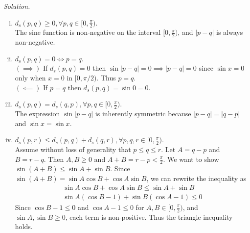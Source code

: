 \documentclass[12pt]{article}
\renewcommand{\_}[1]{\underline{ #1 }}
\theoremstyle{definition}
\newenvironment{exercise}[1]
  {\renewcommand\theinnercustomthm{#1}\innercustomthm}
  {\endinnercustomthm}
\newenvironment{solution}{\par\noindent\textit{Solution.}\ }{\par}
\numberwithin{equation}{subsection}
\begin{document}
\begin{exercise}{6}
    \begin{solution}
        \begin{enumerate} [(i)]
            \item $d_s(p, q) \ge 0, \forall p, q \in [0, \frac{\pi}{2})$. \\
            The sine function is non-negative on the interval $[0, \frac{\pi}{2})$, and $|p - q|$ is always non-negative.
            \item $d_s(p, q) = 0 \iff p = q$. \\
            $(\implies)$ If $d_s(p, q) = 0$ then $\sin |p - q| = 0 \implies |p - q| = 0$ since $\sin x = 0$ only when $x = 0$ in $[0, \pi / 2)$. Thus $p = q$. \\
            $(\impliedby)$ If $p = q$ then $d_s(p, q) = \sin 0 = 0$. 
            \item $d_s(p, q) = d_s(q, p), \forall p, q \in [0, \frac{\pi}{2})$. \\
            The expression $\sin |p - q|$ is inherently symmetric because $|p - q| = |q - p|$ and $\sin x = \sin x$. 
            \item $d_s(p, r) \le d_s(p, q) + d_s (q, r), \forall p, q, r \in [0, \frac{\pi}{2})$. \\
            Assume without loss of generality that $p \le q \le r$. Let $A = q - p$ and $B = r - q$. Then $A, B \ge 0$ and $A + B = r - p < \frac{\pi}{2}$. We want to show $\sin(A + B) \le \sin A + \sin B$. Since $\sin(A + B) = \sin A \cos B + \cos A \sin B$, we can rewrite the inequality as \begin{equation*}
                \begin{gathered}
                    \sin A \cos B + \cos A \sin B \le \sin A + \sin B \\
                    \sin A (\cos B - 1) + \sin B (\cos A - 1) \le 0
                \end{gathered}
            \end{equation*}
            Since $\cos B - 1 \le 0$ and $\cos A - 1 \le 0$ for $A, B \in [0, \frac{\pi}{2})$, and $\sin A, \sin B \ge 0$, each term is non-positive. Thus the triangle inequality holds. 
        \end{enumerate}
    \end{solution}
\end{exercise}
\end{document}

